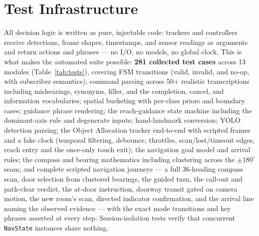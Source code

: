 \section{Test Infrastructure}
\label{sec:test_infrastructure}

All decision logic is written as pure, injectable code: trackers and controllers
receive detections, frame shapes, timestamps, and sensor readings as arguments and
return actions and phrases --- no I/O, no models, no global clock. This is what
makes the automated suite possible: \textbf{281 collected test cases} across 13
modules (Table~\ref{tab:tests}), covering FSM transitions (valid, invalid, and
no-op, with subscriber semantics); command parsing across 50+ realistic
transcriptions including mishearings, synonyms, filler, and the completion,
cancel, and information vocabularies; spatial bucketing with per-class priors and
boundary cases; guidance phrase rendering; the reach-guidance state machine
including the dominant-axis rule and degenerate inputs; hand-landmark conversion;
YOLO detection parsing; the Object Allocation tracker end-to-end with scripted
frames and a fake clock (temporal filtering, debounce, throttles,
scan/lost/timeout edges, reach entry and the once-only touch exit); the
navigation goal model and arrival rules; the compass and bearing mathematics
including clustering across the $\pm180^\circ$ seam; and complete scripted
navigation journeys --- a full 36-heading compass scan, door selection from
clustered bearings, the guided turn, the call-out and path-clear verdict, the
at-door instruction, doorway transit gated on camera motion, the new room's scan,
directed indicator confirmation, and the arrival line naming the observed
evidence --- with the exact mode transitions and key phrases asserted at every
step. Session-isolation tests verify that concurrent \texttt{NavState} instances
share nothing.

